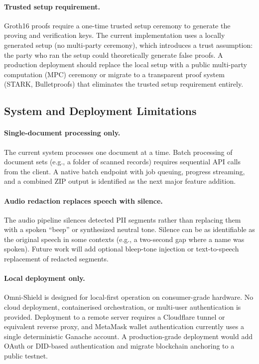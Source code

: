 \documentclass[conference]{IEEEtran}
\begin{document}
\paragraph{Trusted setup requirement.}
Groth16 proofs require a one-time trusted setup
ceremony to generate the proving and verification keys.
The current implementation uses a locally generated
setup (no multi-party ceremony), which introduces a
trust assumption: the party who ran the setup could
theoretically generate false proofs.
A production deployment should replace the local setup
with a public multi-party computation (MPC) ceremony
or migrate to a transparent proof system (STARK,
Bulletproofs) that eliminates the trusted setup
requirement entirely.

\subsection{System and Deployment Limitations}

\paragraph{Single-document processing only.}
The current system processes one document at a time.
Batch processing of document sets (e.g., a folder of
scanned records) requires sequential API calls from
the client.
A native batch endpoint with job queuing, progress
streaming, and a combined ZIP output is identified as
the next major feature addition.

\paragraph{Audio redaction replaces speech with silence.}
The audio pipeline silences detected PII segments
rather than replacing them with a spoken ``beep''
or synthesized neutral tone.
Silence can be as identifiable as the original
speech in some contexts (e.g., a two-second gap
where a name was spoken).
Future work will add optional bleep-tone injection
or text-to-speech replacement of redacted segments.

\paragraph{Local deployment only.}
Omni-Shield is designed for local-first operation
on consumer-grade hardware.
No cloud deployment, containerised orchestration,
or multi-user authentication is provided.
Deployment to a remote server requires a Cloudflare
tunnel or equivalent reverse proxy, and MetaMask wallet
authentication currently uses a single deterministic
Ganache account.
A production-grade deployment would add OAuth or
DID-based authentication and migrate blockchain
anchoring to a public testnet.
\end{document}
